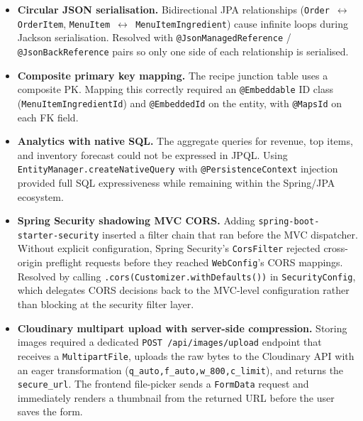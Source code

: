 \documentclass[12pt,a4paper]{article}
\begin{document}
\begin{itemize}
    \item \textbf{Circular JSON serialisation.} Bidirectional JPA relationships
          (\texttt{Order $\leftrightarrow$ OrderItem},
          \texttt{MenuItem $\leftrightarrow$ MenuItemIngredient}) cause infinite
          loops during Jackson serialisation. Resolved with
          \texttt{@JsonManagedReference} / \texttt{@JsonBackReference} pairs so
          only one side of each relationship is serialised.

    \item \textbf{Composite primary key mapping.} The recipe junction table uses
          a composite PK. Mapping this correctly required an
          \texttt{@Embeddable} ID class (\texttt{MenuItemIngredientId}) and
          \texttt{@EmbeddedId} on the entity, with \texttt{@MapsId} on each FK
          field.

    \item \textbf{Analytics with native SQL.} The aggregate queries for revenue,
          top items, and inventory forecast could not be expressed in JPQL.
          Using \texttt{EntityManager.createNativeQuery} with
          \texttt{@PersistenceContext} injection provided full SQL
          expressiveness while remaining within the Spring/JPA ecosystem.

    \item \textbf{Spring Security shadowing MVC CORS.} Adding
          \texttt{spring-boot-starter-security} inserted a filter chain that
          ran before the MVC dispatcher. Without explicit configuration,
          Spring Security's \texttt{CorsFilter} rejected cross-origin preflight
          requests before they reached \texttt{WebConfig}'s CORS mappings.
          Resolved by calling \texttt{.cors(Customizer.withDefaults())} in
          \texttt{SecurityConfig}, which delegates CORS decisions back to the
          MVC-level configuration rather than blocking at the security filter
          layer.

    \item \textbf{Cloudinary multipart upload with server-side compression.}
          Storing images required a dedicated \texttt{POST /api/images/upload}
          endpoint that receives a \texttt{MultipartFile}, uploads the raw bytes
          to the Cloudinary API with an eager transformation
          (\texttt{q\_auto,f\_auto,w\_800,c\_limit}), and returns the
          \texttt{secure\_url}. The frontend file-picker sends a
          \texttt{FormData} request and immediately renders a thumbnail from
          the returned URL before the user saves the form.


\end{itemize}
\end{document}
